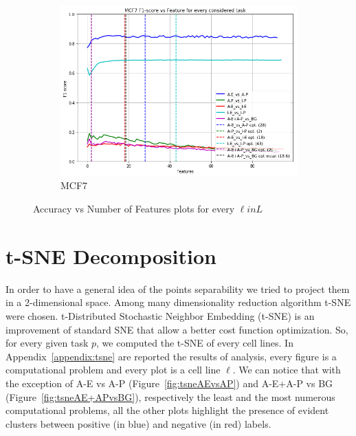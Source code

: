 \begin{figure}[!htb]
    \begin{subfigure}[b]{0.48\textwidth}
        \includegraphics[width=\textwidth]{images/features_plots/MCF7_feature_plot.png}
        \caption{MCF7}
        \label{fig:MCF7_n_feat}
    \end{subfigure}
    \caption{Accuracy vs Number of Features plots for every $\ell in L$}\label{fig:feats_plot}
\end{figure}


\section{t-SNE Decomposition}
In order to have a general idea of the points separability we tried to  project them in a 2-dimensional space. Among many dimensionality reduction algorithm t-SNE were chosen. t-Distributed Stochastic Neighbor Embedding (t-SNE) \cite{vanDerMaaten2008} is an improvement of standard SNE \cite{HintonSNE} that allow a better cost function optimization. So, for every given task $p$, we  computed the t-SNE of every cell lines. 
In Appendix~\ref{appendix:tsne} are reported the results of analysis, every figure is a computational problem and every plot is a cell line $\ell$. We can notice that with the exception of A-E vs A-P (Figure~\ref{fig:tsneAEvsAP}) and A-E+A-P vs BG (Figure~\ref{fig:tsneAE+APvsBG}), respectively the least and the most numerous computational problems, all the other plots highlight the presence of evident clusters between positive (in blue) and negative (in red) labels. 